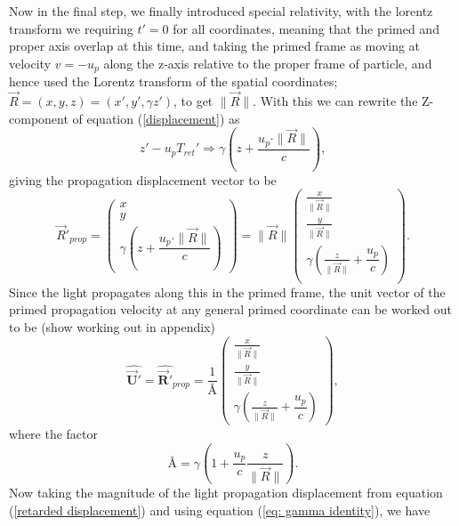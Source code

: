 Now in the final step, we finally introduced special relativity, with the lorentz transform we requiring $t'= 0$ for all coordinates, meaning that the primed and proper axis overlap at this time, and taking the primed frame as moving at velocity $v=-u_p$ along the z-axis relative to the proper frame of particle, and hence used the Lorentz transform of the spatial coordinates; $\vec{R}=(x,y,z)=(x',y',\gamma z')$, to get $\|\vec{R}\|$. With this we can rewrite the Z-component of equation (\eqref{displacement}) as
\begin{equation}%
    z' - u_p T_{ret}' \Rightarrow \gamma\left(z + \frac{u_p\cdot \|\vec{R}\|}{c}\right),
\end{equation}%
giving the propagation displacement vector to be
\begin{equation}%
\label{retarded displacement}
    \Vec{R}'_{prop}= \begin{pmatrix}
    x\\ y \\ \gamma \left(z + \dfrac{u_p \cdot \|\vec{R}\|}{c}\right)
    \end{pmatrix} = \|\vec{R}\|\begin{pmatrix}
    \frac{x}{\|\vec{R}\|}\\ \frac{y}{\|\vec{R}\|} \\ \gamma \left( \frac{z}{\|\vec{R}\|} + \dfrac{u_p}{c} \right)\\
    \end{pmatrix}.
\end{equation}%
Since the light propagates along this in the primed frame, the unit vector of the primed propagation velocity at any general primed coordinate can be worked out to be (show working out in appendix) 
\begin{equation}%
\label{eq: unit retarded velocity}
    \hat{\mathbf{\vec{U}'}} = \hat{\mathbf{\vec{R}'}}_{prop} = \dfrac{1}{\text{\AA}} \begin{pmatrix}
    \frac{x}{\|\vec{R}\|}\\ \frac{y}{\|\vec{R}\|} \\ \gamma \left( \frac{z}{\|\vec{R}\|} + \dfrac{u_p}{c} \right)
    \end{pmatrix},
\end{equation}%
where the factor
\begin{equation}%
    \text{\AA} = \gamma\left( 1 + \frac{u_p}{c}\frac{z}{\|\vec{R}\|} \right). 
\end{equation}%
Now taking the magnitude of the light propagation displacement from equation (\eqref{retarded displacement}) and using equation (\eqref{eq: gamma identity}), we have
